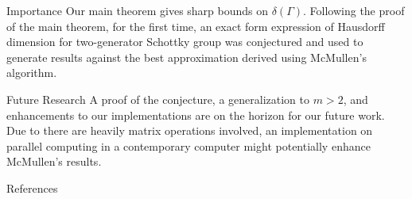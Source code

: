 \documentclass[final]{beamer}
\newlength{\onecolwid}
\newlength{\twocolwid}
\begin{document}
\begin{frame}[t]
\begin{columns}[t]
\begin{column}{\onecolwid}
\begin{scriptsize}
\end{scriptsize}



\begin{block}{Importance}
{\footnotesize Our main theorem gives sharp bounds on $\delta(\Gamma)$. Following the proof of the main theorem, for the first time, an exact form expression of Hausdorff dimension for two-generator Schottky group was conjectured and used to generate results against the best approximation derived using McMullen's algorithm.}
\end{block}

\begin{block}{Future Research}
{\footnotesize A proof of the conjecture, a generalization to $m>2$, and enhancements to our implementations are on the horizon for our future work. Due to there are heavily matrix operations involved, an implementation on parallel computing in a contemporary computer might potentially enhance McMullen's results.}
\end{block}

\begin{block}{References}


{\tiny }



\end{block}
\end{column}%
\end{columns}%
\end{frame}
\end{document}
